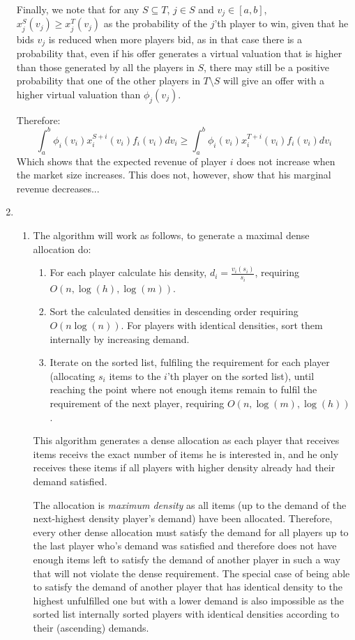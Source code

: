 \documentclass[a4page,notitlepage]{article}
\begin{document}
\begin{enumerate}
  Finally, we note that for any $S\subseteq T$, $j\in S$ and $v_j\in [a,b]$, $x_j^S(v_j)\geq x_j^T(v_j)$ as the probability of the $j$'th player to win, given that he bids $v_j$ is reduced when more players bid, as in that case there is a probability that, even if his offer generates a virtual valuation that is higher than those generated by all the players in $S$, there may still be a positive probability that one of the other players in $T\setminus S$ will give an offer with a higher virtual valuation than $\phi_j(v_j)$.
  
Therefore:
\begin{equation*}
  \int_a^b\phi_i(v_i)x_i^{S+{i}}(v_i)f_i(v_i)dv_i \geq \int_a^b\phi_i(v_i)x_i^{T+{i}}(v_i)f_i(v_i)dv_i
\end{equation*}
Which shows that the expected revenue of player $i$ does not increase when the market size increases.
This does not, however, show that his marginal revenue decreases...

\item
  \begin{enumerate}
  \item The algorithm will work as follows, to generate a maximal
    dense allocation do:
    \begin{enumerate}
    \item For each player calculate his density, $d_i=\frac{v_i(s_i)}{s_i}$, requiring $O(n,\log(h),\log(m))$.
    \item Sort the calculated densities in descending order requiring $O(n\log(n))$.
      For players with identical densities, sort them internally by increasing demand.
    \item Iterate on the sorted list, fulfiling the requirement for
      each player (allocating $s_i$ items to the $i$'th player on the sorted list), until reaching the point where not enough items
      remain to fulfil the requirement of the next player, requiring $O(n,\log(m),\log(h))$.
    \end{enumerate}
    This algorithm generates a dense allocation as each player that receives items receivs the exact number of items he is interested in, and he only receives these items if all players with higher density already had their demand satisfied.

    The allocation is \textit{maximum density} as all items (up to the demand of the next-highest density player's demand) have been allocated.
Therefore, every other dense allocation must satisfy the demand for all players up to the last player who's demand was satisfied and therefore does not have enough items left to satisfy the demand of another player in such a way that will not violate the dense requirement.
The special case of being able to satisfy the demand of another player that has identical density to the highest unfulfilled one but with a lower demand is also impossible as the sorted list internally sorted players with identical densities according to their (ascending) demands.


\end{enumerate}
\end{enumerate}
\end{document}
